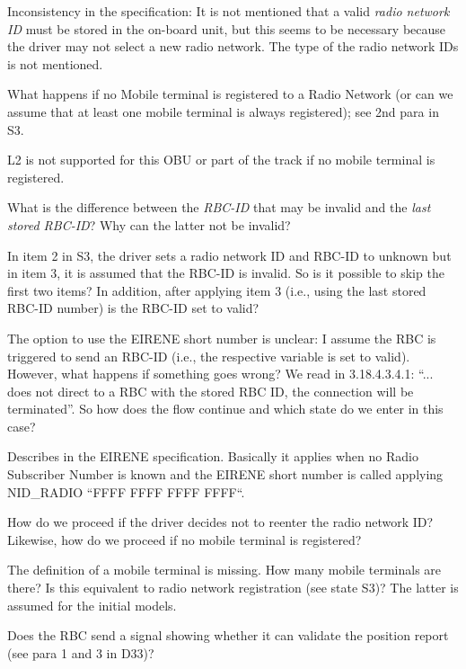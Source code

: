 \documentclass{template/openetcs_article}
\begin{document}
Inconsistency in the specification: It is not mentioned that a valid \emph{radio network ID} must be stored in the on-board unit, but this seems to be necessary because the driver may not select a new radio network. The type of the radio network IDs is not mentioned.

What happens if no Mobile terminal is registered to a Radio Network (or can we assume that at least one mobile terminal is always registered); see 2nd para in S3.

\resolution L2 is not supported for this OBU or part of the track if no mobile terminal is registered.

What is the difference between the \emph{RBC-ID} that may be invalid and the \emph{last stored RBC-ID}? Why can the latter not be invalid?



In item 2 in S3, the driver sets a radio network ID and RBC-ID to unknown but in item 3, it is assumed that the RBC-ID is invalid. So is it possible to skip the first two items? In addition, after applying item 3 (i.e., using the last stored RBC-ID number) is the RBC-ID set to valid?

The option to use the EIRENE short number is unclear: I assume the RBC is triggered to send an RBC-ID (i.e., the respective variable is set to valid). However, what happens if something goes wrong? We read in 3.18.4.3.4.1:  ``... does not direct to a RBC with the stored RBC ID, the connection will be terminated''. So how does the flow continue and which state do we enter in this case?

\resolution Describes in the EIRENE specification. Basically it applies when no Radio Subscriber Number is known and the EIRENE short number is called applying NID\_RADIO ``FFFF FFFF FFFF FFFF``.

How do we proceed if the driver decides not to reenter the radio network ID? Likewise, how do we proceed if no mobile terminal is registered?

The definition of a mobile terminal is missing. How many mobile terminals are there? Is this equivalent to radio network registration (see state S3)? The latter is assumed for the initial models.

Does the RBC send a signal showing whether it can validate the position report (see para 1 and 3 in D33)?
\end{document}
